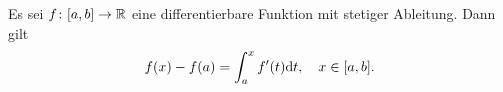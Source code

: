 Es sei $f\colon [a,b]\to \mathbb{R}$ eine differentierbare Funktion mit stetiger Ableitung. Dann gilt
\begin{equation*}
    f(x)-f(a) = \int_a^x f'(t)\mathrm{d} t,\quad x\in[a,b].
\end{equation*}
